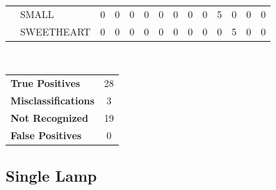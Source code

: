 \documentclass[12pt]{article}
\begin{document}
\begin{table}[h]
\begin{tabular}{ll|l|l|l|l|l|l|l|l|l|l|l|l|}
\multicolumn{1}{|l}{} & \multicolumn{1}{|l|}{SMALL}      & 0   & 0   & 0         & 0     & 0    & 0      & 0     & 0   & 5     & 0          & 0              & 0              \\ \cline{2-14} 
\multicolumn{1}{|l}{} & \multicolumn{1}{|l|}{SWEETHEART} & 0   & 0   & 0         & 0     & 0    & 0      & 0     & 0   & 0     & 5          & 0              & 0              \\ \hline
\end{tabular}
\\
\begin{tabular}{l c}

\textbf{True Positives} & 28 \\
\textbf{Misclassifications} & 3 \\
\textbf{Not Recognized} & 19 \\
\textbf{False Positives} & 0 \\

\end{tabular}
\end{table}

\newpage
\subsection*{Single Lamp}
\end{document}
